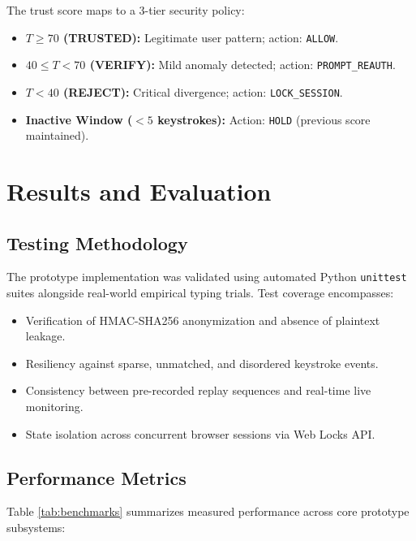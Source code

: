 \documentclass[12pt, a4paper, oneside]{report}
\begin{document}
The trust score maps to a 3-tier security policy:
\begin{itemize}
    \item \textbf{$T \ge 70$ (TRUSTED):} Legitimate user pattern; action: \texttt{ALLOW}.
    \item \textbf{$40 \le T < 70$ (VERIFY):} Mild anomaly detected; action: \texttt{PROMPT\_REAUTH}.
    \item \textbf{$T < 40$ (REJECT):} Critical divergence; action: \texttt{LOCK\_SESSION}.
    \item \textbf{Inactive Window ($<5$ keystrokes):} Action: \texttt{HOLD} (previous score maintained).
\end{itemize}

\chapter{Results and Evaluation}

\section{Testing Methodology}
The prototype implementation was validated using automated Python \texttt{unittest} suites alongside real-world empirical typing trials. Test coverage encompasses:
\begin{itemize}
    \item Verification of HMAC-SHA256 anonymization and absence of plaintext leakage.
    \item Resiliency against sparse, unmatched, and disordered keystroke events.
    \item Consistency between pre-recorded replay sequences and real-time live monitoring.
    \item State isolation across concurrent browser sessions via Web Locks API.
\end{itemize}

\section{Performance Metrics}
Table \ref{tab:benchmarks} summarizes measured performance across core prototype subsystems:
\end{document}
